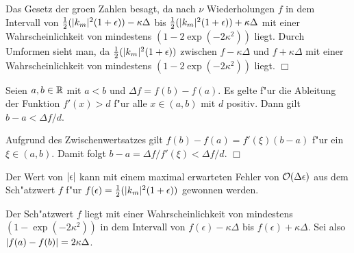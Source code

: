              Das Gesetz der gro\3en Zahlen besagt, da\3 nach $\nu$ Wiederholungen $f$ in dem Intervall von $\frac{1}{2}(\vert k_m  \vert^2(1+\epsilon))-\kappa\Delta$ bis
             $\frac{1}{2}(\vert k_m  \vert^2(1+\epsilon))+\kappa\Delta$ mit einer Wahrscheinlichkeit von mindestens $(1-2\exp(-2\kappa^2))$ liegt. Durch Umformen 
             sieht man, da\3 $\frac{1}{2}(\vert k_m  \vert^2(1+\epsilon))$ zwischen $f-\kappa\Delta$ und $f+\kappa\Delta$ mit einer Wahrscheinlichkeit von mindestens
             $(1-2\exp(-2\kappa^2))$ liegt. \hfill $\Box$
             \begin{lemma} Seien $a,b\in\mathbb{R}$ mit $a<b$ und $\Delta f = f(b)-f(a)$. Es gelte f"ur die Ableitung der Funktion $f'(x)>d$ f"ur alle $x\in (a,b)$ mit
                $d$ positiv. Dann gilt $b-a<\Delta f / d$.
             \end{lemma}
             \beweis Aufgrund des Zwischenwertsatzes gilt $f(b)-f(a)=f'(\xi)(b-a)$ f"ur ein $\xi\in (a,b)$. Damit folgt $b-a=\Delta f / f'(\xi) < \Delta f / d$.
               \hfill $\Box$
             \begin{satz}
               Der Wert von $\vert \epsilon \vert$ kann mit einem maximal erwarteten Fehler von ${\cal O}(\Delta\epsilon)$ aus dem Sch"atzwert $f$ f"ur
               $f(\epsilon)=\frac{1}{2}(\vert k_m  \vert^2(1+\epsilon))$ gewonnen werden.
             \end{satz}
             \beweis Der Sch"atzwert $f$ liegt mit einer Wahrscheinlichkeit von mindestens $(1-\exp(-2\kappa^2))$ in dem Intervall von 
               $f(\epsilon)-\kappa\Delta$ bis $f(\epsilon)+\kappa\Delta$. Sei also $\vert f(a)-f(b) \vert=2\kappa\Delta$.
